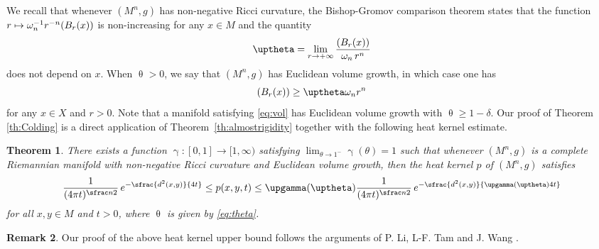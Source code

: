 \documentclass[10pt]{amsart}
\newcommand\mto{\mathchoice{\longmapsto}{\mapsto}{\mapsto}{\mapsto}}
\newcommand{\NoChangel}[1]{%
\expandafter\let\csname old\string#1\endcsname=#1
\let#1=\relax
\newcommand{#1}{\mathcode`l="716C\csname old\string#1\endcsname\mathcode`l="7160 }%
}
\theoremstyle{plain}
\newtheorem{theorem}{Theorem}[section]
\theoremstyle{definition}
\newtheorem{remark}[theorem]{Remark}
\DeclareMathOperator{\vol}{vol}\NoChangel{\vol}
\begin{document}
We recall that whenever $(M^n,g)$ has non-negative Ricci curvature, the Bishop-Gromov comparison theorem states that the function $r\mto \omega_n^{-1} r^{-n}\vol (B_r(x))$ is non-increasing for any $x \in M$
and the quantity
\begin{equation}\label{eq:theta}
\uptheta=\lim_{r\to +\infty} \frac{\vol (B_r(x))}{\omega_n\, r^n}
\end{equation}
does not depend on $x$. When $\uptheta>0$, we say that $(M^n,g)$ has Euclidean volume growth, in which case one has
\begin{equation}\label{eq:volumelowerbound}
\vol (B_r(x)) \ge \uptheta \omega_n r^n
\end{equation}
for any $x \in X$ and $r>0$. Note that a manifold satisfying \eqref{eq:vol} has Euclidean volume growth with $\uptheta \ge 1-\delta$. Our proof of Theorem \ref{th:Colding} is a direct application of Theorem~\ref{th:almostrigidity} together with the following heat kernel estimate.
\begin{theorem}\label{th:estimate} There exists a function $\upgamma\colon [0,1]\to [1,\infty)$ satisfying $\lim_{\theta\to 1^-} \upgamma(\theta)=1$ such that
whenever $(M^n,g)$ is a complete Riemannian manifold with non-negative Ricci curvature and Euclidean volume growth, then the heat kernel $p$ of $(M^n,g)$ satisfies
\[
\frac{1}{(4\pi t)^{\sfrac n2}}\,e^{-\sfrac{d^2(x,y)}{4t}}\le p(x,y,t)\le \upgamma(\uptheta) \frac{1}{(4\pi t)^{\sfrac n2}}\,e^{-\sfrac{d^2(x,y)}{\upgamma(\uptheta)4t}}
\]
for all $x,y \in M$ and $t>0$, where $\uptheta$ is given by \eqref{eq:theta}.
\end{theorem}

\begin{remark} Our proof of the above heat kernel upper bound follows the arguments of P. Li, L-F. Tam and J. Wang \cite{LiTamWang}.
\end{remark}
\end{document}
